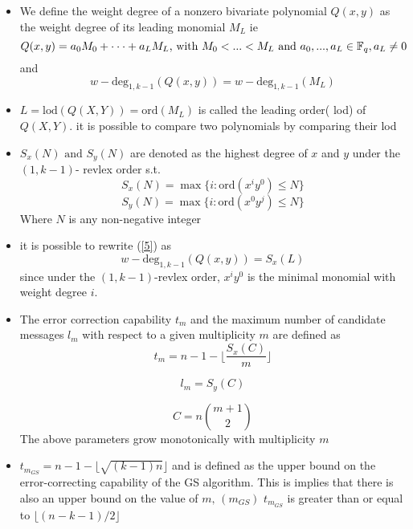 \documentclass[fontsize=12pt]{article}
\begin{document}
\begin{itemize}
\item We define the weight degree of a nonzero bivariate polynomial $Q(x,y)$ as the weight degree of its leading monomial $M_L$
ie 
\begin{equation}
Q(x,y) = a_0M_0+\cdot\cdot\cdot+a_LM_L\text{, with 		} \\
M_0<...<M_L \text{ and } a_0,...,a_L \in \mathbb{F}_q, a_L\neq 0
\end{equation} 
and
\begin{equation}
 w-\text{deg}_{1,k-1} (Q(x,y)) =  w-\text{deg}_{1,k-1}(M_L)
 \label{5}
\end{equation}
\item $L= \text{lod}(Q(X,Y)) =\text{ord}(M_L)$ is called the leading order( lod) of $Q(X,Y)$. it is possible to compare two polynomials by comparing their lod
\item $S_x(N) \text{ and } S_y(N) $ are denoted as the highest degree of $x$ and $y$ under the $(1,k-1) $- revlex order s.t. 
\begin{equation}
S_x(N) = \max{\{ i: \text{ord}(x^iy^0) \leq N  \}}
\end{equation}
\begin{equation}
S_y(N) = \max{\{ i: \text{ord}(x^0y^j) \leq N  \}}
\end{equation}
Where $N$ is any non-negative integer 
\item it is possible to rewrite (\ref{5}) as 
\begin{equation}
 w-\text{deg}_{1,k-1} (Q(x,y)) = S_x(L) 
\end{equation}
since under the $(1, k - 1)$-revlex order, $x^iy^0$ is the minimal monomial
with weight degree $i$.
\item The error correction capability $t_m$ and the maximum number of candidate messages $l_m$  with respect to a given multiplicity $m$ are defined as
\begin{equation}
t_m = n-1 -\Big\lfloor\frac{S_x(C)}{m}\Big\rfloor
\end{equation}

\begin{equation}
l_m = S_y(C)
\label{10}
\end{equation}

\begin{equation}
C =n\binom{m+1}{2}
\end{equation}
The above parameters grow monotonically with multiplicity $m$
\item $t_{m_{GS}} = n-1 -\Big\lfloor\sqrt{(k-1)n}\Big\rfloor$ and is defined as the upper bound on the error-correcting capability of the GS algorithm. This is implies that there is also an upper bound on the value of $m \text{, }(m_{GS})$
$t_{m_{GS}}$ is greater than or equal to $\Big\lfloor(n-k-1)/2\Big\rfloor$
\end{itemize}
\end{document}
